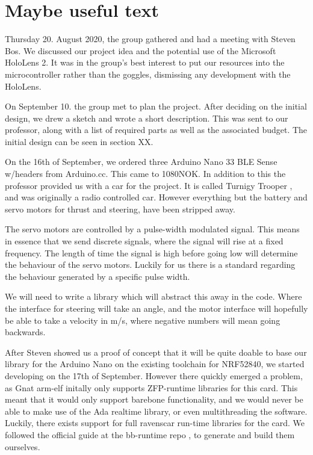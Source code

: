 \documentclass{article}
\begin{document}
\maketitle

\newpage
\tableofcontents

\newpage
\section{Maybe useful text}

Thursday 20. August 2020, the group gathered and had a meeting with Steven Bos. We discussed our project idea and the potential use of the Microsoft HoloLens 2. It was in the group's best interest to put our resources into the microcontroller rather than the goggles, dismissing any development with the HoloLens.

\vspace{5mm}
On September 10. the group met to plan the project. After deciding on the initial design, we drew a sketch and wrote a short description. This was sent to our professor, along with a list of required parts as well as the associated budget. The initial design can be seen in section XX.

\vspace{5mm}

On the 16th of September, we ordered three Arduino Nano 33 BLE Sense w/headers from Arduino.cc. This came to 1080NOK. In addition to this the professor provided us with a car for the project. It is called Turnigy Trooper \cite{CAR}, and was originally a radio controlled car. However everything but the battery and servo motors for thrust and steering, have been stripped away. 

The servo motors are controlled by a pulse-width modulated signal. This means in essence that we send discrete signals, where the signal will rise at a fixed frequency. The length of time the signal is high before going low will determine the behaviour of the servo motors. Luckily for us there is a standard regarding the behaviour generated by a specific pulse width. 

We will need to write a library which will abstract this away in the code. Where the interface for steering will take an angle, and the motor interface will hopefully be able to take a velocity in m/s, where negative numbers will mean going backwards.

\vspace{5mm}
After Steven showed us a proof of concept that it will be quite doable to base our library for the Arduino Nano on the existing toolchain for NRF52840, we started developing on the 17th of September. However there quickly emerged a problem, as Gnat arm-elf initally only supports ZFP-runtime libraries for this card. This meant that it would only support barebone functionality, and we would never be able to make use of the Ada realtime library, or even multithreading the software. Luckily, there exists support for full ravenscar run-time libraries for the card. We followed the official guide at the bb-runtime repo \cite{BBRUNTIMES}, to generate and build them ourselves.
\end{document}
